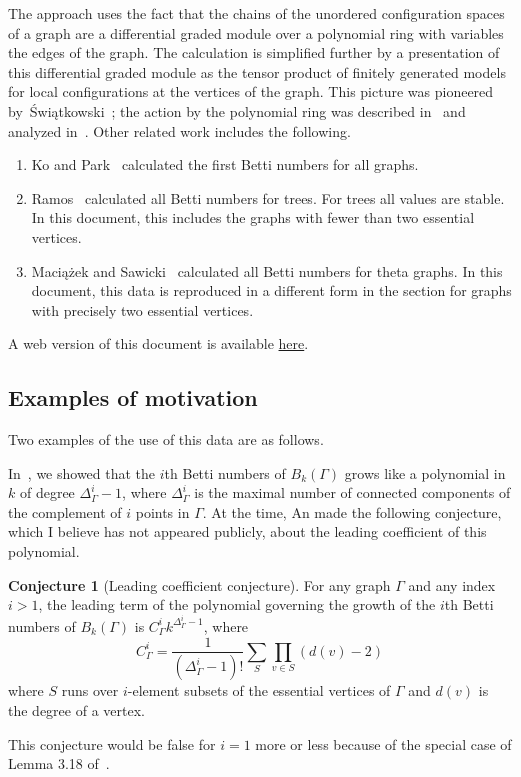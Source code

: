 \documentclass{amsart}
\theoremstyle{definition}
\newtheorem{conjecture}{Conjecture}
\begin{document}
The approach uses the fact that the chains of the unordered configuration spaces of a graph are a differential graded module over a polynomial ring with variables the edges of the graph.
The calculation is simplified further by a presentation of this differential graded module as the tensor product of finitely generated models for local configurations at the vertices of the graph.
This picture was pioneered by~\'Swi\k{a}tkowski~\cite{Swiatkowski:EHDCSG}; the action by the polynomial ring was described in~\cite{AnDrummond-ColeKnudsen:SSGBG} and analyzed in~\cite{AnDrummondColeKnudsen:ESHGBG}.
Other related work includes the following.
\begin{enumerate}
\item Ko and Park~\cite{KoPark:CGBG} calculated the first Betti numbers for all graphs.
\item Ramos~\cite{Ramos:SPHTBG} calculated all Betti numbers for trees. For trees all values are stable. In this document, this includes the graphs with fewer than two essential vertices.
\item Maci\k{a}\.{z}ek and Sawicki~\cite{MaciazekSawicki:NAQSG} calculated all Betti numbers for theta graphs. In this document, this data is reproduced in a different form in the section for graphs with precisely two essential vertices.
\end{enumerate}
A web version of this document is available \href{https://drummondcole.com/gabriel/academic/graph_configuration_betti_numbers/}{here}.

\subsection*{Examples of motivation}
Two examples of the use of this data are as follows.

In~\cite{AnDrummondColeKnudsen:ESHGBG}, we showed that the $i$th Betti numbers of $B_k(\Gamma)$ grows like a polynomial in $k$ of degree $\Delta_\Gamma^i-1$, where $\Delta_\Gamma^i$ is the maximal number of connected components of the complement of $i$ points in $\Gamma$. 
At the time, An made the following conjecture, which I believe has not appeared publicly, about the leading coefficient of this polynomial.
\begin{conjecture}[Leading coefficient conjecture]
For any graph $\Gamma$ and any index $i>1$, the leading term of the polynomial governing the growth of the $i$th Betti numbers of $B_k(\Gamma)$ is $C_\Gamma^i k^{\Delta_\Gamma^i-1}$, where
\[
C_\Gamma^i = \frac{1}{(\Delta_\Gamma^i-1)!}\sum_S \prod_{v\in S} (d(v)-2)
\]
where $S$ runs over $i$-element subsets of the essential vertices of $\Gamma$ and $d(v)$ is the degree of a vertex.
\end{conjecture}
This conjecture would be false for $i=1$ more or less because of the special case of Lemma 3.18 of~\cite{AnDrummondColeKnudsen:ESHGBG}. 
\end{document}
